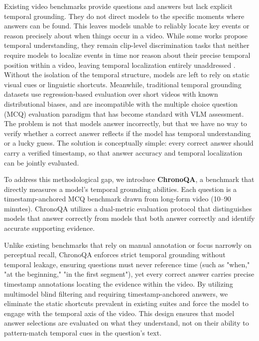 \documentclass[sigconf,natbib=false,nonacm]{acmart}
\begin{document}
Existing video benchmarks provide questions and answers but lack explicit temporal grounding. They do not direct models to the specific moments where answers can be found. This leaves models unable to reliably locate key events or reason precisely about when things occur in a video. While some works propose temporal understanding, they remain clip-level discrimination tasks that neither require models to localize events in time nor reason about their precise temporal position within a video, leaving temporal localization entirely unaddressed \cite{temporalbench}. Without the isolation of the temporal structure, models are left to rely on static visual cues or linguistic shortcuts. Meanwhile, traditional temporal grounding datasets \cite{charades} \cite{activitynetqa} use regression-based evaluation over short videos with known distributional biases, and are incompatible with the multiple choice question (MCQ) evaluation paradigm that has become standard with VLM assessment. The problem is not that models answer incorrectly, but that we have no way to verify whether a correct answer reflects if the model has temporal understanding or a lucky guess. The solution is conceptually simple: every correct answer should carry a verified timestamp, so that answer accuracy and temporal localization can be jointly evaluated.


To address this methodological gap, we introduce \textbf{ChronoQA}, a benchmark that directly measures a model's temporal grounding abilities. Each question is a timestamp-anchored MCQ benchmark drawn from long-form video (10–90 minutes). ChronoQA utilizes a dual-metric evaluation protocol that distinguishes models that answer correctly from models that both answer correctly and identify accurate supporting evidence. 

Unlike existing benchmarks that rely on manual annotation or focus narrowly on perceptual recall, ChronoQA enforces strict temporal grounding without temporal leakage, ensuring questions must never reference time (such as "when," "at the beginning," "in the first segment"), yet every correct answer carries precise timestamp annotations locating the evidence within the video. By utilizing multimodel blind filtering and requiring timestamp-anchored answers, we eliminate the static shortcuts prevalent in existing suites and force the model to engage with the temporal axis of the video. This design ensures that model answer selections are evaluated on what they understand, not on their ability to pattern-match temporal cues in the question's text.
\end{document}
